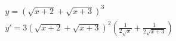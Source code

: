\begin{ex}
\begin{align}
&y= (\sqrt{x+2}+\sqrt{x+3})^3\nonumber\\
&y'=3(\sqrt{x+2}+\sqrt{x+3})^2\left(\frac{1}{2\sqrt{x}}+\frac{1}{2\sqrt{x+3}}\right)\nonumber
\end{align}
\end{ex}
